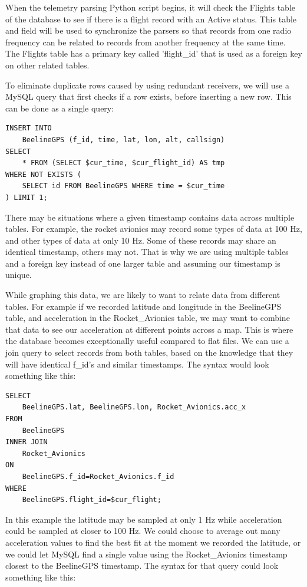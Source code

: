 \documentclass[onecolumn, draftclsnofoot, 10pt, compsoc]{IEEEtran}
\begin{document}
When the telemetry parsing Python script begins, it will check the Flights table of the database to see if there is a flight record with an Active status.  This table and field will be used to synchronize the parsers so that records from one radio frequency can be related to records from another frequency at the same time.  The Flights table has a primary key called 'flight\_id' that is used as a foreign key on other related tables.

To eliminate duplicate rows caused by using redundant receivers, we will use a MySQL query that first checks if a row exists, before inserting a new row.  This can be done as a single query: \cite{unique-sql-insert}

\begin{lstlisting}[frame=single]
INSERT INTO
	BeelineGPS (f_id, time, lat, lon, alt, callsign)
SELECT
	* FROM (SELECT $cur_time, $cur_flight_id) AS tmp
WHERE NOT EXISTS (
    SELECT id FROM BeelineGPS WHERE time = $cur_time
) LIMIT 1;
\end{lstlisting}

There may be situations where a given timestamp contains data across multiple tables.  For example, the rocket avionics may record some types of data at 100 Hz, and other types of data at only 10 Hz.  Some of these records may share an identical timestamp, others may not.  That is why we are using multiple tables and a foreign key instead of one larger table and assuming our timestamp is unique.

While graphing this data, we are likely to want to relate data from different tables.  For example if we recorded latitude and longitude in the BeelineGPS table, and acceleration in the Rocket\_Avionics table, we may want to combine that data to see our acceleration at different points across a map.  This is where the database becomes exceptionally useful compared to flat files.  We can use a join query to select records from both tables, based on the knowledge that they will have identical f\_id's and similar timestamps.  The syntax would look something like this:

\begin{lstlisting}[frame=single]
SELECT
	BeelineGPS.lat, BeelineGPS.lon, Rocket_Avionics.acc_x
FROM
	BeelineGPS
INNER JOIN
	Rocket_Avionics
ON
	BeelineGPS.f_id=Rocket_Avionics.f_id
WHERE
	BeelineGPS.flight_id=$cur_flight;
\end{lstlisting}

In this example the latitude may be sampled at only 1 Hz while acceleration could be sampled at closer to 100 Hz.  We could choose to average out many acceleration values to find the best fit at the moment we recorded the latitude, or we could let MySQL find a single value using the Rocket\_Avionics timestamp closest to the BeelineGPS timestamp.  The syntax for that query could look something like this: \cite{sql-foreign-key}
\end{document}
